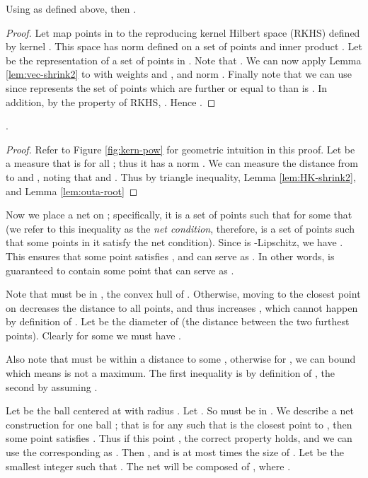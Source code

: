 \documentclass[11pt]{myclass}
\begin{document}
\begin{lemma}
\label{lem:HK-shrink2}
Using  as defined above, then
.
\end{lemma}
\begin{proof}
Let  map points in  to the reproducing kernel Hilbert space (RKHS)  defined by kernel .  This space has norm  defined on a set of points  and inner product .  Let  be the representation of a set of points  in .  
Note that .  
We can now apply Lemma \ref{lem:vec-shrink2} to  with weights  and , and norm .  
Finally note that we can use  since  represents the set of points which are further or equal to  than is .   
In addition, by the property of RKHS, . 
Hence
.
\end{proof}





\begin{lemma}
\label{lem:sq-bnd2}
.  
\end{lemma}
\begin{proof}
Refer to Figure \ref{fig:kern-pow} for geometric intuition in this proof.  
Let  be a measure that is  for all ; thus it has a norm .  
We can measure the distance from  to  and , noting that  and .  Thus by triangle inequality, Lemma \ref{lem:HK-shrink2}, and Lemma \ref{lem:outa-root} 

\end{proof}



Now we place a net  on ; specifically, it is a set of points such that for some  that
 (we refer to this inequality as the \emph{net condition}, therefore,  is a set of points such that some points in it satisfy the net condition).  Since  is -Lipschitz, we have 
. 
This ensures that some point  satisfies , and can serve as .  
In other words,  is guaranteed to contain some point  that can serve as .  

Note that  must be in , the convex hull of .  Otherwise, moving to the closest point on  decreases the distance to all points, and thus increases , which cannot happen by definition of .  Let  be the diameter of  (the distance between the two furthest points).  Clearly for some  we must have .  

Also note that  must be within a distance  to some , otherwise for , we can bound
 which means  is not a maximum.  
The first inequality is by definition of , the second by assuming .  


Let  be the ball centered at  with radius .  
Let .  
So  must be in .  
We describe a net  construction for one ball ; that is for any  such that  is the closest point to , then some point  satisfies  .  Thus if this point , the correct property holds, and we can use the corresponding  as .  
Then , and is at most  times the size of .  
Let  be the smallest integer  such that .  
The net  will be composed of , where . 
\end{document}
